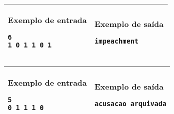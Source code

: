 \begin{table}[!h]
\centering
\begin{tabular}{|l|l|}
\hline
\begin{minipage}[t]{3in}
\textbf{Exemplo de entrada}
\begin{verbatim}
6
1 0 1 1 0 1
\end{verbatim}
\vspace{1mm}
\end{minipage}
&

\begin{minipage}[t]{3in}
\textbf{Exemplo de saída}
\begin{verbatim}
impeachment
\end{verbatim}
\vspace{1mm}
\end{minipage} \\
\hline
\end{tabular}
\end{table}

\begin{table}[!h]
\centering
\begin{tabular}{|l|l|}
\hline
\begin{minipage}[t]{3in}
\textbf{Exemplo de entrada}
\begin{verbatim}
5
0 1 1 1 0
\end{verbatim}
\vspace{1mm}
\end{minipage}
&

\begin{minipage}[t]{3in}
\textbf{Exemplo de saída}
\begin{verbatim}
acusacao arquivada
\end{verbatim}
\vspace{1mm}
\end{minipage} \\
\hline
\end{tabular}
\end{table}
